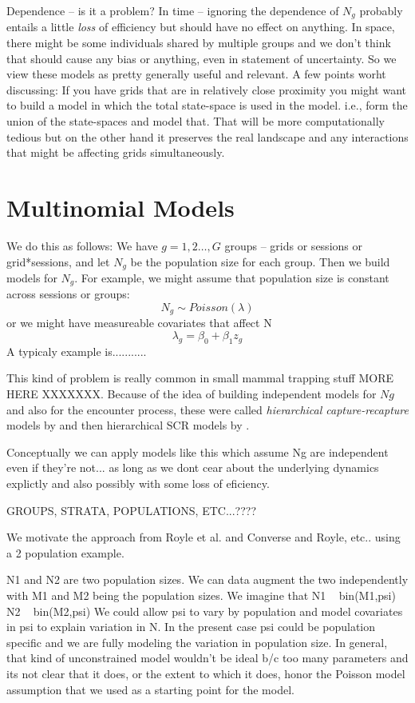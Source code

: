 Dependence -- is it a problem?
In time -- ignoring the dependence of $N_{g}$ probably entails a
little {\it loss} of efficiency but should have no effect on anything.
In space, there might be some individuals shared by multiple groups
and we don't think that should cause any bias or anything, even in
statement of uncertainty. So we view these models as pretty generally
useful and relevant.
A few points worht discussing: If you have grids that are in
relatively close proximity you might want to build a model in which
the total state-space is used in the model. i.e., form the union of
the state-spaces and model that. That will be more computationally
tedious but on the other hand it preserves the real landscape and any
interactions that might be affecting grids simultaneously. 


\section{Multinomial Models}

We do this as follows: We have $g=1,2\ldots, G$ groups -- grids or
sessions or grid*sessions, and let $N_{g}$ be the population size for
each group. Then we build models for $N_{g}$. For example, we might
assume that population size is constant across sessions or groups:
\[
 N_{g} \sim Poisson(\lambda)
\]
or we might have measureable covariates that affect N
\[
 \lambda_{g} = \beta_{0} + \beta_{1} z_{g}
\]
A typicaly example is...........


This kind of problem is really common in small mammal trapping stuff
\citep{converse_royle:xxxx} MORE HERE XXXXXXX.
Because of the idea of building independent models for $Ng$ and also
for the encounter process, these were called 
{\it hierarchical capture-recapture} models by \citep{royle_etal:2013}
and then hierarchical SCR models by \citep{converse_royle:2013}. 

Conceptually we can apply models like this which assume Ng are
independent even if they're not... as long as we dont cear about the
underlying dynamics explictly and also possibly with some loss of
eficiency. 

GROUPS, STRATA, POPULATIONS, ETC...????


We motivate the approach from Royle et al. and Converse and Royle,
etc.. using a 2 population example.

N1 and N2 are two population sizes. We can data augment the two
independently with M1 and M2 being the population sizes.  We imagine
that
N1 ~ bin(M1,psi)
N2 ~ bin(M2,psi)
We could allow psi to vary by population and model covariates in psi
to explain variation in N. In the present case psi could be population
specific and we are fully modeling the variation in population
size. In general, that kind of unconstrained model wouldn't be ideal
b/c too many parameters and its not clear that it does, or the extent
to which it does, honor the Poisson model assumption that we used as a
starting point for the model.

